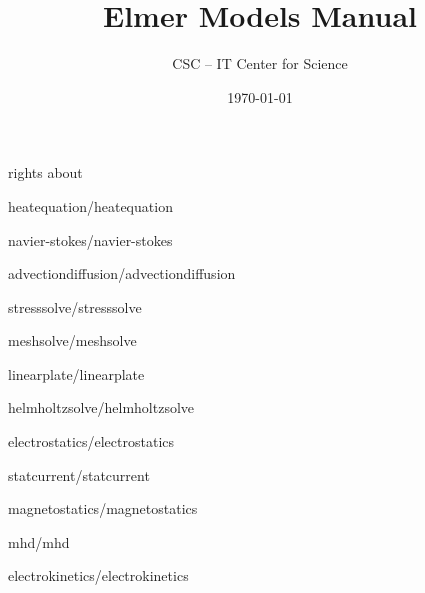 \documentclass[a4paper,english,10pt]{report}    %
\title{\Huge{\bf Elmer Models Manual}}
\author{CSC -- IT Center for Science}
\date{\today}
\newcommand{\Include}{}
\begin{document}
\maketitle


\begin{versiona}
\Include{rights}
\Include{about}

\pagestyle{empty}

\setcounter{secnumdepth}{2}
\setcounter{tocdepth}{1}  

\tableofcontents
\end{versiona}



\renewcommand{\chaptername}{Model}
\newpage
\pagestyle{fancy}


\clearpage

\graphicspath{{./}{heatequation/}}
\Include{heatequation/heatequation}

\graphicspath{{./}{navier-stokes/}}
\Include{navier-stokes/navier-stokes}

\graphicspath{{./}{advectiondiffusion/}}
\Include{advectiondiffusion/advectiondiffusion}

\graphicspath{{./}{stresssolve/}}
\Include{stresssolve/stresssolve}

\graphicspath{{./}{meshsolve/}}
\Include{meshsolve/meshsolve}

\graphicspath{{./}{linearplate/}}
\Include{linearplate/linearplate}



\graphicspath{{./}{helmholtzsolve/}}
\Include{helmholtzsolve/helmholtzsolve}

\graphicspath{{./}{electrostatics/}}
\Include{electrostatics/electrostatics}

\graphicspath{{./}{statcurrent/}}
\Include{statcurrent/statcurrent}

\graphicspath{{./}{magnetostatics/}}
\Include{magnetostatics/magnetostatics}

\graphicspath{{./}{mhd/}}
\Include{mhd/mhd}

\graphicspath{{./}{electrokinetics/}}
\Include{electrokinetics/electrokinetics}
\end{document}
